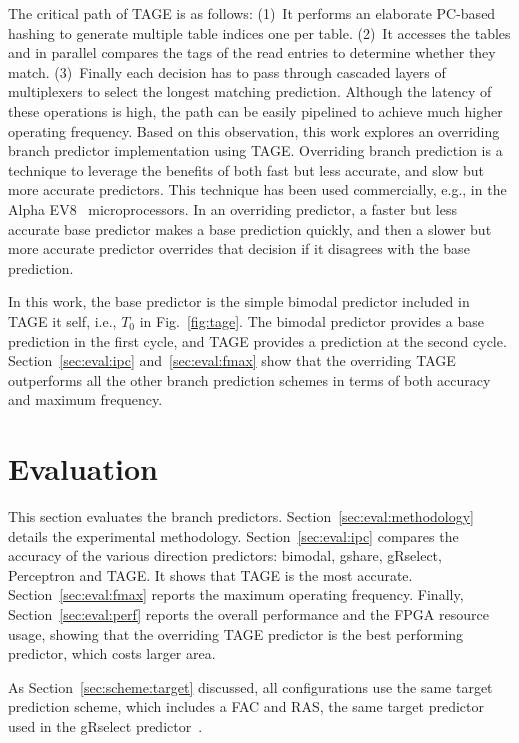 \documentclass[conference]{IEEEtran}
\begin{document}
The critical path of TAGE is as follows: (1)~It performs an elaborate PC-based hashing to generate multiple table indices one per table. (2)~It accesses the tables and in parallel compares the tags of the read entries to determine whether they match. (3)~Finally each decision has to pass through cascaded layers of multiplexers to select the longest matching prediction. Although the latency of these operations is high, the path can be easily pipelined to achieve much higher operating frequency. Based on this observation, this work explores an overriding branch predictor implementation using TAGE. Overriding branch prediction is a technique to leverage the benefits of both fast but less accurate, and slow but more accurate predictors. This technique has been used commercially, e.g., in the Alpha EV8~\cite{alphaEV8} microprocessors. In an overriding predictor, a faster but less accurate base predictor makes a base prediction quickly, and then a slower but more accurate predictor overrides that decision if it disagrees with the base prediction. 

In this work, the base predictor is the simple bimodal predictor included in TAGE it self, i.e., $T_0$ in Fig.~\ref{fig:tage}. The bimodal predictor provides a base prediction in the first cycle, and TAGE provides a prediction at the second cycle. Section~\ref{sec:eval:ipc} and~\ref{sec:eval:fmax} show that the overriding TAGE outperforms all the other branch prediction schemes in terms of both accuracy and maximum frequency.

\section{Evaluation}
\label{sec:eval}
This section evaluates the branch predictors. Section~\ref{sec:eval:methodology} details the experimental methodology. Section~\ref{sec:eval:ipc} compares the accuracy of the various direction predictors: bimodal, gshare, gRselect, Perceptron and TAGE. It shows that TAGE is the most accurate. Section~\ref{sec:eval:fmax} reports the maximum operating frequency. Finally, Section~\ref{sec:eval:perf} reports the overall performance and the FPGA resource usage, showing that the overriding TAGE predictor is the best performing predictor, which costs larger area.

As Section~\ref{sec:scheme:target} discussed, all configurations use the same target prediction scheme, which includes a FAC and RAS, the same target predictor used in the gRselect predictor~\cite{grselect}.
\end{document}
